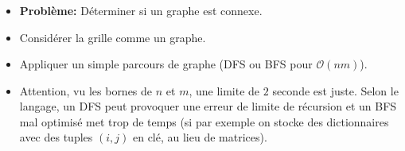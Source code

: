 \begin{frame}
    \frametitle{\problemtitle}
    \begin{itemize}
        \item<+-> \textbf{Problème:} Déterminer si un graphe est connexe.
        \item<+-> Considérer la grille comme un graphe.
        \item<+-> Appliquer un simple parcours de graphe (DFS ou BFS pour $\mathcal O(nm)$).
        \item<+-> Attention, vu les bornes de $n$ et $m$, une limite de $2$ seconde est juste. Selon le langage, un DFS peut provoquer une erreur de limite de récursion et un BFS mal optimisé met trop de temps (si par exemple on stocke des dictionnaires avec des tuples $(i,j)$ en clé, au lieu de matrices).
    \end{itemize}
\end{frame}
